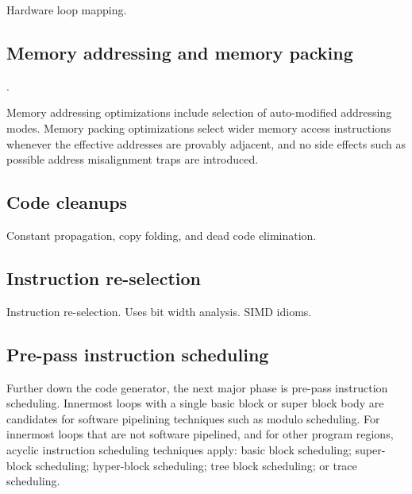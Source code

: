 Hardware loop mapping.

\subsection{Memory addressing and memory packing}.

Memory addressing optimizations include selection of auto-modified addressing
modes. Memory packing optimizations select wider memory access instructions
whenever the effective addresses are provably adjacent, and no side effects such
as possible address misalignment traps are introduced.

\subsection{Code cleanups}

Constant propagation, copy folding, and dead code elimination.

\subsection{Instruction re-selection}

Instruction re-selection. Uses bit width analysis. SIMD idioms.

\subsection{Pre-pass instruction scheduling}

Further down the code generator, the next major phase is pre-pass instruction
scheduling. Innermost loops with a single basic block or super block body are
candidates for software pipelining techniques such as modulo scheduling. For
innermost loops that are not software pipelined, and for other program regions,
acyclic instruction scheduling techniques apply: basic block scheduling;
super-block scheduling; hyper-block scheduling; tree block scheduling; or trace
scheduling.

